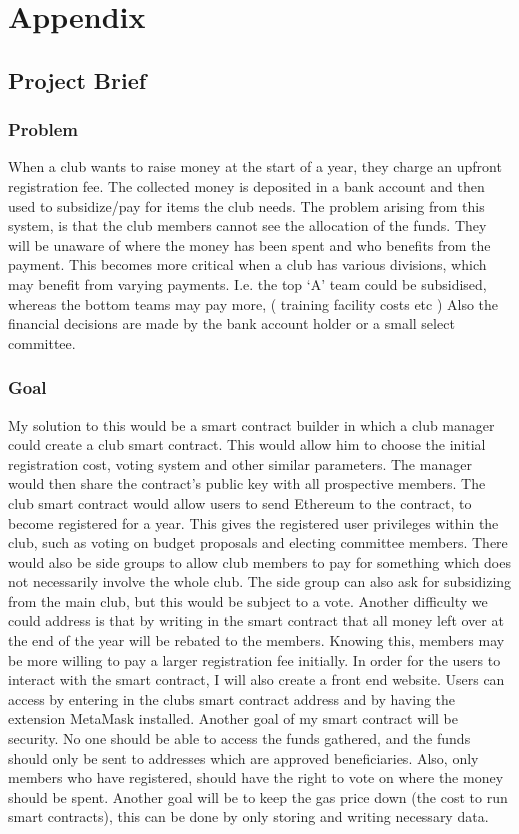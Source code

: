 \chapter{Appendix} \label{Chapter:Appendix}
\section{Project Brief}
\subsection{Problem}
When a club wants to raise money at the start of a year, they charge an upfront registration fee. The collected money is deposited in a bank account and then used to subsidize/pay for items the club needs. The problem arising from this system, is that the club members cannot see the allocation of the funds. They will be unaware of where the money has been spent and who benefits from the payment. This becomes more critical when a club has various divisions, which may benefit from varying payments. I.e. the top ‘A’ team could be subsidised, whereas the bottom teams may pay more, ( training facility costs etc ) Also the financial decisions are made by the bank account holder or a small select committee.
\subsection{Goal}
My solution to this would be a smart contract builder in which a club manager could create a club smart contract. This would allow him to choose the initial registration cost, voting system and other similar parameters. The manager would then share the contract’s public key with all prospective members. The club smart contract would allow users to send Ethereum to the contract, to become registered for a year. This gives the registered user privileges within the club, such as voting on budget proposals and electing committee members. There would also be side groups to allow club members to pay for something which does not necessarily involve the whole club. The side group can also ask for subsidizing from the main club, but this would be subject to a vote. Another difficulty we could address is that by writing in the smart contract that all money left over at the end of the year will be rebated to the members. Knowing this, members may be more willing to pay a larger registration fee initially. In order for the users to interact with the smart contract, I will also create a front end website. Users can access by entering in the clubs smart contract address and by having the extension MetaMask installed. Another goal of my smart contract will be security. No one should be able to access the funds gathered, and the funds should only be sent to addresses which are approved beneficiaries. Also, only members who have registered, should have the right to vote on where the money should be spent. Another goal will be to keep the gas price down (the cost to run smart contracts), this can be done by only storing and writing necessary data.
